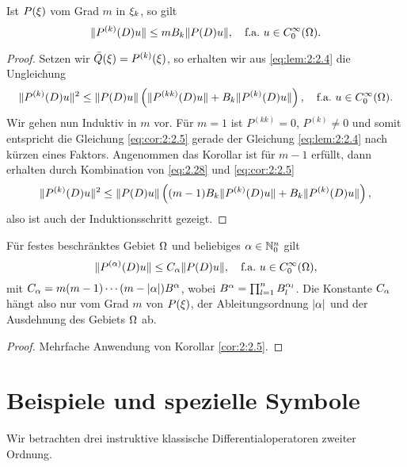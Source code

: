 \begin{cor}\label{cor:2:2.5}
Ist $P(\xi)$ vom Grad $m$ in $\xi_k$, so gilt
\begin{equation}\label{eq:cor:2:2.5}
\lVert P^{(k)}(D)u\rVert\leq mB_k\lVert P(D)u\rVert,
\quad\text{f.a.}~u\in C^\infty_0(\Omega).
\end{equation}
\end{cor}
\begin{proof}
Setzen wir $\bar{Q}(\xi)=P^{(k)}(\xi)$, so erhalten wir aus \eqref{eq:lem:2:2.4} die Ungleichung
\begin{equation}\label{eq:2.28}
\lVert P^{(k)}(D)u\rVert^2\leq\lVert P(D)u\rVert\left(\lVert P^{(kk)}(D)u\rVert+B_k\lVert P^{(k)}(D)u\rVert\right),
\quad\text{f.a.}~u\in C^\infty_0(\Omega).
\end{equation}
Wir gehen nun Induktiv in $m$ vor.
Für $m=1$ ist $P^{(kk)}=0$, $P^{(k)}\neq0$ und somit entspricht die Gleichung \eqref{eq:cor:2:2.5}
gerade der Gleichung \eqref{eq:lem:2:2.4} nach kürzen eines Faktors.
Angenommen das Korollar ist für $m-1$ erfüllt,
dann erhalten durch Kombination von \eqref{eq:2.28} und \eqref{eq:cor:2:2.5}
\begin{equation}
\lVert P^{(k)}(D)u\rVert^2\leq\lVert P(D)u\rVert\left((m-1)B_k\lVert P^{(k)}(D)u\rVert+B_k\lVert P^{(k)}(D)u\rVert\right),
\end{equation}
also ist auch der Induktionsschritt gezeigt.
\end{proof}

\begin{cor}\label{cor:2:2.6}
Für festes beschränktes Gebiet $\Omega$ und beliebiges $\alpha\in\mathbb N^n_0$ gilt
\begin{equation}
\lVert P^{(\alpha)}(D)u\rVert\leq C_\alpha\lVert P(D)u\rVert,
\quad\text{f.a.}~u\in C^\infty_0(\Omega),
\end{equation}
mit $C_\alpha=m(m-1)\cdots(m-\lvert\alpha\rvert)B^\alpha$, wobei $B^\alpha=\prod_{l=1}^n B^{\alpha_l}_l$.
Die Konstante $C_\alpha$ hängt also nur vom Grad $m$ von $P(\xi)$,
der Ableitungsordnung $\lvert\alpha\rvert$ und der Ausdehnung des Gebiets $\Omega$ ab.
\end{cor}

\begin{proof}
Mehrfache Anwendung von Korollar \ref{cor:2:2.5}.
\end{proof}

\section{Beispiele und spezielle Symbole}

Wir betrachten drei instruktive klassische Differentialoperatoren zweiter Ordnung.

